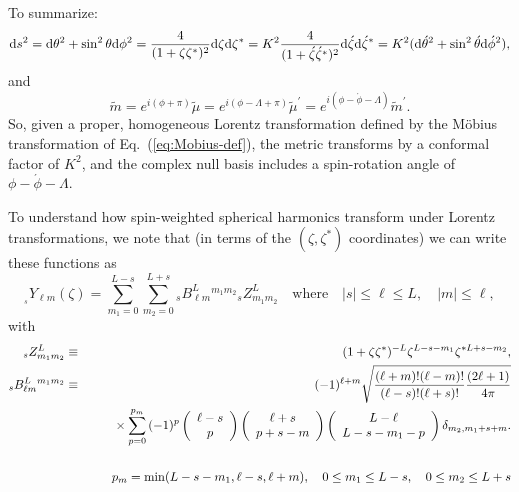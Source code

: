 \documentclass[11pt]{article}
\newcommand{\swY}[4][]{{}_{{}_{#2}}\!Y^{#1}_{#3}(#4)}
\begin{document}
To summarize:
\begin{equation}\label{eq:LorentzMetricTrans}
{\rm d}s^2 = {\rm d}\theta^2+\sin^2\theta{\rm d}\phi^2
     = \frac4{(1+\zeta\zeta^*)^2}{\rm d}\zeta{\rm d}\zeta^*
     =  K^2\frac4{(1+\acute\zeta\acute\zeta^*)^2}
              {\rm d}\acute\zeta{\rm d}\acute\zeta^*
     = K^2({\rm d}\acute\theta^2+\sin^2\acute\theta{\rm d}\acute\phi^2),
\end{equation}
and
\begin{equation}
\tilde{m} = e^{i(\phi+\pi)}\tilde\mu
     = e^{i(\phi-\Lambda+\pi)}\tilde\mu^\prime
     = e^{i(\phi-\acute\phi-\Lambda)}\tilde{m}^\prime.
\end{equation}
So, given a proper, homogeneous Lorentz transformation defined by the
M\"{o}bius transformation of Eq.~(\ref{eq:Mobius-def}), the metric
transforms by a conformal factor of $K^2$, and the complex null basis
includes a spin-rotation angle of $\phi-\acute\phi-\Lambda$.

To understand how spin-weighted spherical harmonics transform under 
Lorentz transformations, we note that (in terms of the $(\zeta,\zeta^*)$
coordinates) we can write these functions as
\begin{equation}
  \swY{s}{\ell m}{\zeta} = \sum_{m_1=0}^{L-s}{\sum_{m_2=0}^{L+s}{
      {}_sB^L_{\ell m}{}^{m_1m_2}{}_sZ^L_{m_1m_2}}}
\quad\mbox{where}\quad |s|\le\ell\le L,\quad |m|\le\ell,
\end{equation}
with
\begin{eqnarray}
 {}_sZ^L_{m_1m_2}&\equiv&(1+\zeta\zeta^*)^{-L}\zeta^{L-s-m_1}\zeta^{*L+s-m_2}, \\
{}_sB^L_{\ell m}{}^{m_1m_2} &\equiv&
    (-1)^{\ell+m}\sqrt{\frac{(\ell+m)!(\ell-m)!}{(\ell-s)!(\ell+s)!}
  \frac{(2\ell+1)}{4\pi}} \nonumber \\ &&\mbox{\hspace{0.25in}}
    \times\sum_{p=0}^{p_m}{(-1)^p
      \left(\begin{array}{c}\ell-s \\ p\end{array}\right)
        \left(\begin{array}{c}\ell+s \\ p+s-m\end{array}\right)
        \left(\begin{array}{c}L-\ell \\ L-s-m_1-p\end{array}\right)
          \delta_{m_2,m_1+s+m}}. \\ && \nonumber\\
    && p_m=\min(L-s-m_1,\ell-s,\ell+m),\quad
       0\le m_1\le L-s,\quad
       0\le m_2\le L+s\nonumber
\end{eqnarray}
\end{document}
